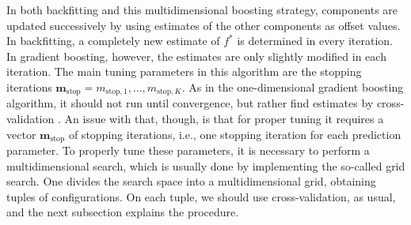 In both backfitting and this multidimensional boosting strategy, components are updated successively by using estimates of the other components as offset values.
In backfitting, a completely new estimate of $f^*$ is determined in every iteration.
In gradient boosting, however, the estimates are only slightly modified in each iteration.
The main tuning parameters in this algorithm are the stopping iterations $\boldsymbol{m}_{\text{stop}}=m_{\text{stop},1},\ldots,m_{\text{stop},K}$.
As in the one-dimensional gradient boosting algorithm, it should not run until convergence, but rather find estimates by cross-validation \citep{schmid}.
An issue with that, though, is that for proper tuning it requires a vector $\boldsymbol{m}_{\text{stop}}$ of stopping iterations, i.e., one stopping iteration for each prediction parameter.
To properly tune these parameters, it is necessary to perform a multidimensional search, which is usually done by implementing the so-called grid search.
One divides the search space into a multidimensional grid, obtaining tuples of configurations.
On each tuple, we should use cross-validation, as usual, and the next subsection explains the procedure.
